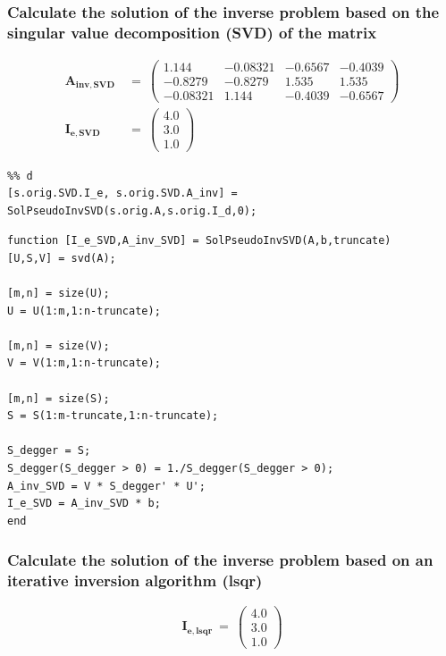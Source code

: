 \clearpage
\subsubsection{ Calculate the solution of the inverse problem based on the singular value
decomposition (SVD) of the matrix}
\begin{align}
    \mathbf{A_{inv,SVD}}\ &=\ \left(\begin{array}{cccc} 1.144 & -0.08321 & -0.6567 & -0.4039\\ -0.8279 & -0.8279 & 1.535 & 1.535\\ -0.08321 & 1.144 & -0.4039 & -0.6567 \end{array}\right)\\
    \mathbf{I_{e,SVD}}\ &=\ \left(\begin{array}{c} 4.0\\ 3.0\\ 1.0 \end{array}\right)
\end{align}
\begin{lstlisting}
%% d
[s.orig.SVD.I_e, s.orig.SVD.A_inv] = SolPseudoInvSVD(s.orig.A,s.orig.I_d,0);
\end{lstlisting}
\begin{lstlisting}
function [I_e_SVD,A_inv_SVD] = SolPseudoInvSVD(A,b,truncate)
[U,S,V] = svd(A);

[m,n] = size(U);
U = U(1:m,1:n-truncate);

[m,n] = size(V);
V = V(1:m,1:n-truncate);

[m,n] = size(S);
S = S(1:m-truncate,1:n-truncate);

S_degger = S;
S_degger(S_degger > 0) = 1./S_degger(S_degger > 0);
A_inv_SVD = V * S_degger' * U';
I_e_SVD = A_inv_SVD * b;
end
\end{lstlisting}



\clearpage
\subsubsection{Calculate the solution of the inverse problem based on an iterative inversion
algorithm (lsqr)}

\begin{equation}
    \mathbf{I_{e,lsqr}}\ =\ \left(\begin{array}{c} 4.0\\ 3.0\\ 1.0 \end{array}\right)    
\end{equation}

